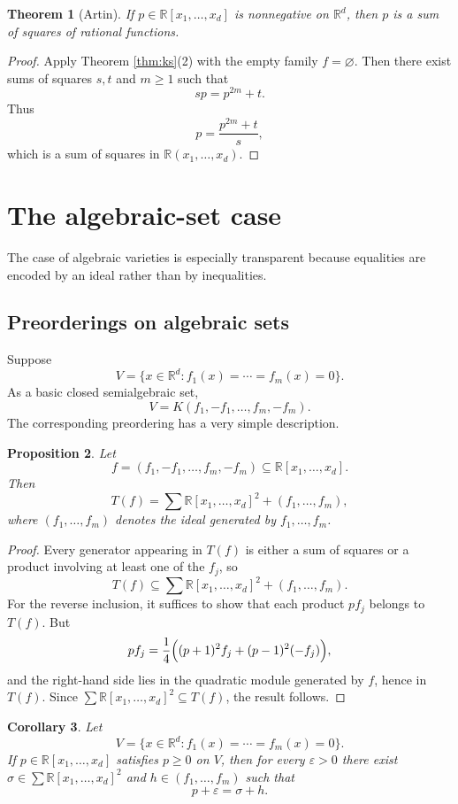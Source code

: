 \documentclass[11pt]{amsart}
\numberwithin{equation}{section}
\newtheorem{theorem}{Theorem}[section]
\newtheorem{proposition}[theorem]{Proposition}
\newtheorem{corollary}[theorem]{Corollary}
\theoremstyle{definition}
\theoremstyle{remark}
\newcommand{\R}{\mathbb{R}}
\newcommand{\Rxd}{\R[x_1,\dots,x_d]}
\newcommand{\sos}{\sum \R[x_1,\dots,x_d]^2}
\newcommand{\eps}{\varepsilon}
\newcommand{\1}{\mathbf{1}}
\begin{document}
\begin{theorem}[Artin]
If \(p\in\Rxd\) is nonnegative on \(\R^d\), then \(p\) is a sum of squares of rational functions.
\end{theorem}

\begin{proof}
Apply Theorem \ref{thm:ks}\textup{(2)} with the empty family \(f=\varnothing\). Then there exist sums of squares \(s,t\) and \(m\ge 1\) such that
\[
sp=p^{2m}+t.
\]
Thus
\[
p=\frac{p^{2m}+t}{s},
\]
which is a sum of squares in \(\R(x_1,\dots,x_d)\).
\end{proof}

\section{The algebraic-set case}\label{sec:algsets}

The case of algebraic varieties is especially transparent because equalities are encoded by an ideal rather than by inequalities.

\subsection{Preorderings on algebraic sets}

Suppose
\[
V=\{x\in\R^d: f_1(x)=\cdots=f_m(x)=0\}.
\]
As a basic closed semialgebraic set,
\[
V=K(f_1,-f_1,\dots,f_m,-f_m).
\]
The corresponding preordering has a very simple description.

\begin{proposition}\label{prop:algpreorder}
Let
\[
f=(f_1,-f_1,\dots,f_m,-f_m)\subseteq\Rxd.
\]
Then
\[
T(f)=\sos+(f_1,\dots,f_m),
\]
where \((f_1,\dots,f_m)\) denotes the ideal generated by \(f_1,\dots,f_m\).
\end{proposition}

\begin{proof}
Every generator appearing in \(T(f)\) is either a sum of squares or a product involving at least one of the \(f_j\), so
\[
T(f)\subseteq \sos+(f_1,\dots,f_m).
\]
For the reverse inclusion, it suffices to show that each product \(pf_j\) belongs to \(T(f)\). But
\[
pf_j=\frac14\Bigl((p+1)^2f_j+(p-1)^2(-f_j)\Bigr),
\]
and the right-hand side lies in the quadratic module generated by \(f\), hence in \(T(f)\). Since \(\sos\subseteq T(f)\), the result follows.
\end{proof}

\begin{corollary}\label{cor:algsetepsilon}
Let
\[
V=\{x\in\R^d: f_1(x)=\cdots=f_m(x)=0\}.
\]
If \(p\in\Rxd\) satisfies \(p\ge 0\) on \(V\), then for every \(\eps>0\) there exist \(\sigma\in\sos\) and \(h\in (f_1,\dots,f_m)\) such that
\[
p+\eps=\sigma+h.
\]
\end{corollary}
\end{document}
